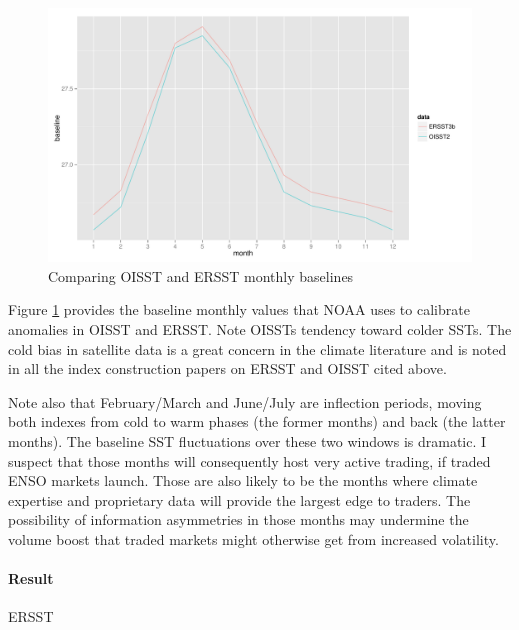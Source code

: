 \documentclass[authoryear]{article}
\begin{document}
\begin{figure}[!htbp]
  \includegraphics[width=\linewidth]{Pricingfigs/CompareOISSTandERRSTbaselines}
  \caption{Comparing OISST and ERSST monthly baselines}
   \label{fig:baeslinesOIER}
\end{figure}

Figure \ref{fig:baeslinesOIER} provides the baseline monthly values that NOAA uses to calibrate anomalies in OISST and ERSST. Note OISSTs tendency toward colder SSTs. The cold bias in satellite data is a great concern in the climate literature and is noted in all the index construction papers on ERSST and OISST cited above.

Note also that February/March and June/July are inflection periods, moving both indexes from cold to warm phases (the former months) and back (the latter months). The baseline SST fluctuations over these two windows is dramatic. I suspect that those months will consequently host very active trading, if traded ENSO markets launch. Those are also likely to be the months where climate expertise and proprietary data will provide the largest edge to traders. The possibility of information asymmetries in those months may undermine the volume boost that traded markets might otherwise get from increased volatility. 

\paragraph{Result}
ERSST
\end{document}
